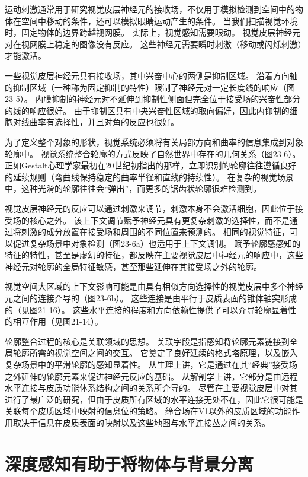 运动刺激通常用于研究视觉皮层神经元的接收场，不仅用于模拟检测到空间中的物体在空间中移动的条件，还可以模拟眼睛运动产生的条件。 
当我们扫描视觉环境时，固定物体的边界跨越视网膜。 
实际上，视觉感知需要眼动。 
视觉皮层神经元对在视网膜上稳定的图像没有反应。 
这些神经元需要瞬时刺激（移动或闪烁刺激）才能激活。


一些视觉皮层神经元具有接收场，其中兴奋中心的两侧是抑制区域。
沿着方向轴的抑制区域（一种称为固定抑制的特性）限制了神经元对一定长度线的响应（图23-5）。 
内膜抑制的神经元对不延伸到抑制性侧面但完全位于接受场的兴奋性部分的线的响应很好。
由于抑制区具有中央兴奋性区域的取向偏好，因此内抑制的细胞对线曲率有选择性，并且对角的反应也很好。


为了定义整个对象的形状，视觉系统必须将有关局部方向和曲率的信息集成到对象轮廓中。
视觉系统整合轮廓的方式反映了自然世界中存在的几何关系（图23-6）。 
正如Gestalt心理学家最初在20世纪初指出的那样，立即识别的轮廓往往遵循良好的延续规则（弯曲线保持稳定的曲率半径和直线的持续性）。 
在复杂的视觉场景中，这种光滑的轮廓往往会“弹出”，而更多的锯齿状轮廓很难检测到。


视觉皮层神经元的反应可以通过刺激来调节，刺激本身不会激活细胞，因此位于接受场的核心之外。 
该上下文调节赋予神经元具有更复杂刺激的选择性，而不是通过将刺激的成分放置在接受场和周围的不同位置来预测的。 
相同的视觉特征，可以促进复杂场景中对象检测（图23-6a）也适用于上下文调制。 
赋予轮廓感感知的特征的特性，甚至是虚幻的特征，都反映在主要视觉皮层中神经元的响应中，这些神经元对轮廓的全局特征敏感，甚至那些延伸在其接受场之外的轮廓。


视觉空间大区域的上下文影响可能是由具有相似方向选择性的视觉皮层中多个神经元之间的连接介导的（图23-6b）。 
这些连接是由平行于皮质表面的锥体轴突形成的（见图21-16）。 
这些水平连接的程度和方向依赖性提供了可以介导轮廓显着性的相互作用（见图21-14）。


轮廓整合过程的核心是关联领域的思想。 
关联字段是指感知将轮廓元素链接到全局轮廓所需的视觉空间之间的交互。 
它奠定了良好延续的格式塔原理，以及嵌入复杂场景中的平滑轮廓的感知显着性。 
从生理上讲，它是通过在其“经典”接受场之外延伸的轮廓元素来促进神经元反应的基础。
从解剖学上讲，它部分是由远程水平连接与皮质功能体系结构之间的关系所介导的。
尽管在主要视觉皮层中对其进行了最广泛的研究，但由于皮质所有区域的水平连接无处不在，因此它很可能是关联每个皮质区域中映射的信息位的策略。 
缔合场在V1以外的皮质区域的功能作用取决于信息在皮质表面的映射以及这些地图与水平连接丛之间的关系。


\section{深度感知有助于将物体与背景分离}

